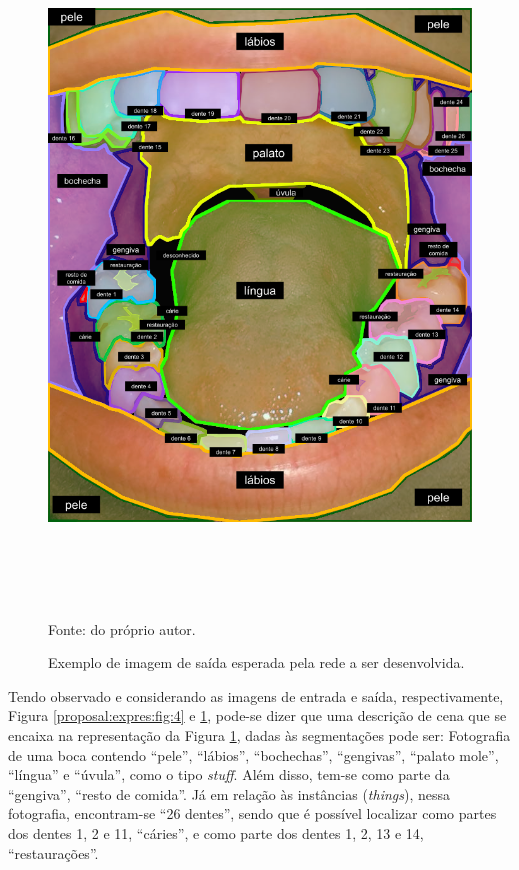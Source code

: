 \begin{figure}[H]
    \centering
    \caption{Exemplo de imagem de saída esperada pela rede a ser desenvolvida.}
    \includegraphics[height=7in]{recursos/imagens/proposal/boca_segmentada_v2.png}
    \label{proposal:expres:fig:5}

    Fonte: do próprio autor.
\end{figure}

Tendo observado e considerando as imagens de entrada e saída, respectivamente, Figura \ref{proposal:expres:fig:4}
 e \ref{proposal:expres:fig:5}, pode-se dizer que uma descrição de cena que se encaixa na representação da Figura \ref{proposal:expres:fig:5}, dadas às segmentações pode ser: Fotografia de uma boca contendo ``pele'', ``lábios'', ``bochechas'', ``gengivas'', ``palato mole'', ``língua'' e ``úvula'', como o tipo \textit{stuff}. Além disso, tem-se como parte da ``gengiva'', ``resto de comida''. Já em relação às instâncias (\textit{things}), nessa fotografia, encontram-se ``26 dentes'', sendo que é possível localizar como partes dos dentes 1, 2 e 11, ``cáries'', e como parte dos dentes 1, 2, 13 e 14, ``restaurações''.

